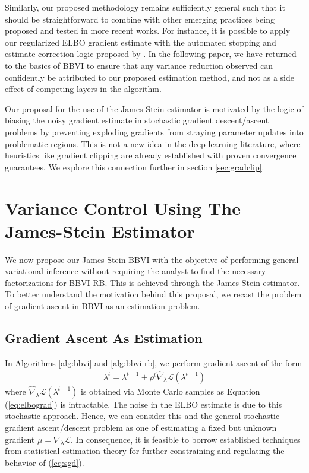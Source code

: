 \documentclass{article}
\begin{document}
Similarly, our proposed methodology remains sufficiently general such that it should be straightforward to combine with other emerging practices being proposed and tested in more recent works. For instance, it is possible to apply our regularized ELBO gradient estimate with the automated stopping and estimate correction logic proposed by \cite{Welandawe-2022}. In the following paper, we have returned to the basics of BBVI to ensure that any variance reduction observed can confidently be attributed to our proposed estimation method, and not as a side effect of competing layers in the algorithm.

Our proposal for the use of the James-Stein estimator is motivated by the logic of biasing the noisy gradient estimate in stochastic gradient descent/ascent problems by preventing exploding gradients from straying parameter updates into problematic regions. This is not a new idea in the deep learning literature, where heuristics like gradient clipping \cite{Koloskova-2023, Goodfellow-2016} are already established with proven convergence guarantees. We explore this connection further in section \ref{sec:gradclip}.

\section{Variance Control Using The James-Stein Estimator}
\label{sec:stein}

We now propose our James-Stein BBVI with the objective of performing general variational inference without requiring the analyst to find the necessary factorizations for BBVI-RB. This is achieved through the James-Stein estimator. To better understand the motivation behind this proposal, we recast the problem of gradient ascent in BBVI as an estimation problem.

\subsection{Gradient Ascent As Estimation}

In Algorithms \ref{alg:bbvi} and \ref{alg:bbvi-rb}, we perform gradient ascent of the form
\begin{align}
\label{eq:sgd}
    \lambda^t = \lambda^{t-1} + \rho^t \hat\nabla_\lambda\mathcal{L}(\lambda^{t-1})
\end{align}
where $\hat\nabla_\lambda\mathcal{L}(\lambda^{t-1})$ is obtained via Monte Carlo samples as Equation (\ref{eq:elbograd}) is intractable. The noise in the ELBO estimate is due to this stochastic approach. Hence, we can consider this and the general stochastic gradient ascent/descent problem as one of estimating a fixed but unknown gradient $\mu = \nabla_\lambda\mathcal{L}$. In consequence, it is feasible to borrow established techniques from statistical estimation theory \cite{Lehmann-1998} for further constraining and regulating the behavior of (\ref{eq:sgd}).
\end{document}
